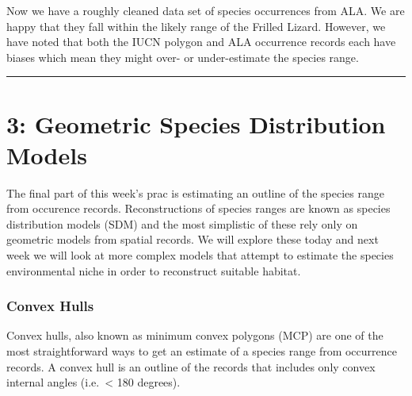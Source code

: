 \documentclass[
  letterpaper,
  DIV=11,
  numbers=noendperiod]{scrartcl}
\begin{document}
Now we have a roughly cleaned data set of species occurrences from ALA.
We are happy that they fall within the likely range of the Frilled
Lizard. However, we have noted that both the IUCN polygon and ALA
occurrence records each have biases which mean they might over- or
under-estimate the species range.

\begin{center}\rule{0.5\linewidth}{0.5pt}\end{center}

\section{\texorpdfstring{\textbf{3}: Geometric Species Distribution
Models}{3: Geometric Species Distribution Models}}\label{geometric-species-distribution-models}

The final part of this week's prac is estimating an outline of the
species range from occurence records. Reconstructions of species ranges
are known as species distribution models (SDM) and the most simplistic
of these rely only on geometric models from spatial records. We will
explore these today and next week we will look at more complex models
that attempt to estimate the species environmental niche in order to
reconstruct suitable habitat.

\subsubsection{Convex Hulls}\label{convex-hulls}

Convex hulls, also known as minimum convex polygons (MCP) are one of the
most straightforward ways to get an estimate of a species range from
occurrence records. A convex hull is an outline of the records that
includes only convex internal angles (i.e.~\textless{} 180 degrees).
\end{document}
